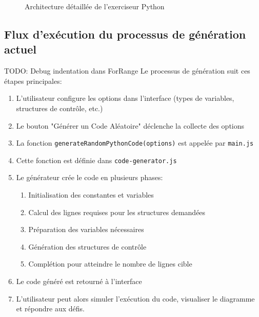 \documentclass[11pt,a4paper]{article}
\begin{document}
\begin{figure}[ht]
\begin{adjustbox}{center,max width=\linewidth}
\end{adjustbox}
\caption{Architecture détaillée de l'exerciseur Python}
\label{fig:architecture}
\end{figure}

\subsection{Flux d'exécution du processus de génération actuel}
TODO: Debug indentation dans ForRange \newline
Le processus de génération suit ces étapes principales:

\begin{enumerate}
    \item L'utilisateur configure les options dans l'interface (types de variables, structures de contrôle, etc.)
    \item Le bouton "Générer un Code Aléatoire" déclenche la collecte des options
    \item La fonction \texttt{generateRandomPythonCode(options)} est appelée par \texttt{main.js}
    \item Cette fonction est définie dans \texttt{code-generator.js}
    \item Le générateur crée le code en plusieurs phases:
    \begin{enumerate}
        \item Initialisation des constantes et variables
        \item Calcul des lignes requises pour les structures demandées
        \item Préparation des variables nécessaires
        \item Génération des structures de contrôle
        \item Complétion pour atteindre le nombre de lignes cible
    \end{enumerate}
    \item Le code généré est retourné à l'interface
    \item L'utilisateur peut alors simuler l'exécution du code, visualiser le diagramme et répondre aux défis.
\end{enumerate}
\end{document}
